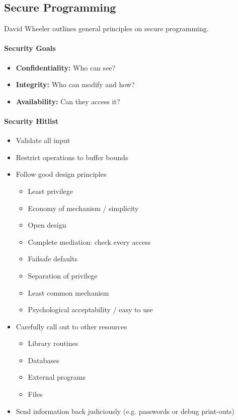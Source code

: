 
\subsection{Secure Programming} %
\label{sub:secure_programming}
David Wheeler \cite{wheeler_2015} outlines general principles on secure programming.

\paragraph{Security Goals} %
\label{par:security_goals}
\begin{itemize}
	\item \textbf{Confidentiality:} Who can see?
	\item \textbf{Integrity:} Who can modify and how?
	\item \textbf{Availability:} Can they access it?
\end{itemize}



\paragraph{Security Hitlist} %
\label{par:security_hitlist}

\begin{itemize}
	\item Validate all input
	\item Restrict operations to buffer bounds
	\item Follow good design principles \cite{1451869}
	\begin{itemize}
		\item Least privilege
		\item Economy of mechanism / simplicity
		\item Open design
		\item Complete mediation: check every access
		\item Failsafe defaults
		\item Separation of privilege
		\item Least common mechanism
		\item Psychological acceptability / easy to use
	\end{itemize}
	\item Carefully call out to other resources
	\begin{itemize}
		\item Library routines
		\item Databases
		\item External programs
		\item Files
	\end{itemize}
	\item Send information back judiciously (e.g. passwords or debug print-outs)
\end{itemize}

